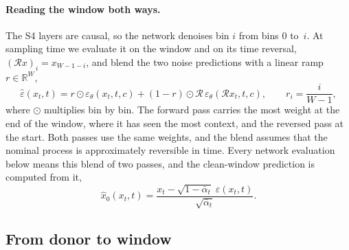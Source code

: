 \documentclass[11pt,a4paper]{article}
\newcommand{\R}{\mathbb{R}}
\newcommand{\xhat}{\hat{x}_{0}}            %
\newcommand{\ehat}{\hat{\varepsilon}}      %
\newcommand{\abar}{\bar\alpha}
\newcommand{\rev}{\mathcal{R}}             %
\begin{document}
\paragraph{Reading the window both ways.}
The S4 layers are causal, so the network denoises bin $i$ from bins $0$
to~$i$. At sampling time we evaluate it on the window and on its time
reversal, $(\rev x)_{i} = x_{W-1-i}$, and blend the two noise predictions with
a linear ramp $r \in \R^{W}$,
\begin{equation}
\label{eq:flip}
\ehat(x_{t}, t)
  = r \odot \varepsilon_{\theta}(x_{t}, t, c)
  + (1 - r) \odot \rev\,\varepsilon_{\theta}(\rev x_{t}, t, c),
\qquad
r_{i} = \frac{i}{W - 1},
\end{equation}
where $\odot$ multiplies bin by bin. The forward pass carries the most weight
at the end of the window, where it has seen the most context, and the reversed
pass at the start. Both passes use the same weights, and the blend assumes
that the nominal process is approximately reversible in time. Every network
evaluation below means this blend of two passes, and the clean-window
prediction is computed from it,
\begin{equation}
\label{eq:x0hat}
\xhat(x_{t}, t)
  = \frac{x_{t} - \sqrt{1 - \abar_{t}}\;\ehat(x_{t}, t)}{\sqrt{\abar_{t}}}.
\end{equation}

\subsection{From donor to window}
\label{sec:chain}
\end{document}
